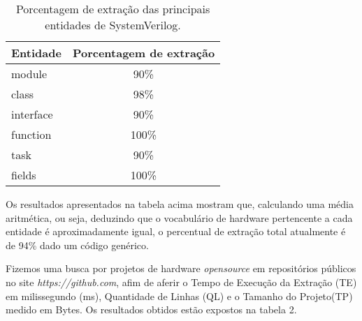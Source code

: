 \documentclass[12pt, twocolumn, a4paper]{article}
\begin{document}
\begin{table}[h]
\centering
\caption{Porcentagem de extração das principais entidades de SystemVerilog.}
	\begin{tabular}{l|c}
	\hline
	Entidade  & Porcentagem de extração\\
	\hline
	module     & 90\% \\
	\hline
	class 	   & 98\% \\
	\hline
	interface  & 90\% \\
	\hline
	function   & 100\% \\
	\hline
	task       & 90\% \\
	\hline
	fields     & 100\% \\
	\hline
	
	\end{tabular}

\end{table}
Os resultados apresentados na tabela acima mostram que, calculando uma média aritmética, ou seja, deduzindo que o vocabulário de hardware pertencente a cada entidade é aproximadamente igual, o percentual de extração total atualmente é de 94\% dado um código genérico.

Fizemos uma busca por projetos de hardware \textit{opensource} em repositórios públicos no site \textit{https://github.com}, afim de aferir o Tempo de Execução da Extração (TE) em milissegundo (ms), Quantidade de Linhas (QL) e o Tamanho do Projeto(TP) medido em Bytes. Os resultados obtidos estão expostos na tabela 2.
	
\end{document}
